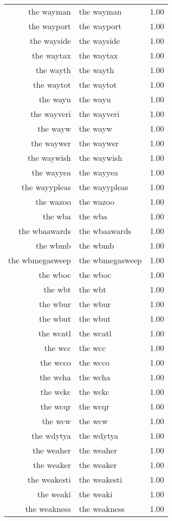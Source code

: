 \begin{table}[ht]
\begin{tabular}{rlr}
  the wayman & the wayman & 1.00 \\ 
  the wayport & the wayport & 1.00 \\ 
  the wayside & the wayside & 1.00 \\ 
  the waytax & the waytax & 1.00 \\ 
  the wayth & the wayth & 1.00 \\ 
  the waytot & the waytot & 1.00 \\ 
  the wayu & the wayu & 1.00 \\ 
  the wayveri & the wayveri & 1.00 \\ 
  the wayw & the wayw & 1.00 \\ 
  the waywer & the waywer & 1.00 \\ 
  the waywish & the waywish & 1.00 \\ 
  the wayyea & the wayyea & 1.00 \\ 
  the wayypleas & the wayypleas & 1.00 \\ 
  the wazoo & the wazoo & 1.00 \\ 
  the wba & the wba & 1.00 \\ 
  the wbaawards & the wbaawards & 1.00 \\ 
  the wbmb & the wbmb & 1.00 \\ 
  the wbmegasweep & the wbmegasweep & 1.00 \\ 
  the wboc & the wboc & 1.00 \\ 
  the wbt & the wbt & 1.00 \\ 
  the wbur & the wbur & 1.00 \\ 
  the wbut & the wbut & 1.00 \\ 
  the wcatl & the wcatl & 1.00 \\ 
  the wcc & the wcc & 1.00 \\ 
  the wcco & the wcco & 1.00 \\ 
  the wcha & the wcha & 1.00 \\ 
  the wckc & the wckc & 1.00 \\ 
  the wcqr & the wcqr & 1.00 \\ 
  the wcw & the wcw & 1.00 \\ 
  the wdytya & the wdytya & 1.00 \\ 
  the weaher & the weaher & 1.00 \\ 
  the weaker & the weaker & 1.00 \\ 
  the weakesti & the weakesti & 1.00 \\ 
  the weaki & the weaki & 1.00 \\ 
  the weakness & the weakness & 1.00 \\ 

\end{tabular}
\end{table}
